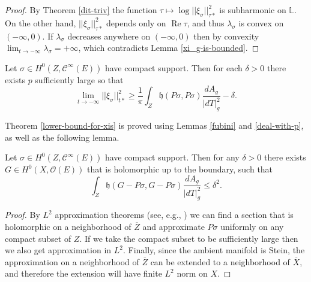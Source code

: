 \documentclass[12pt,hidelinks]{amsart}
\newcommand{\cO}{{\mathcal O}}
\newcommand{\sC}{{\mathscr C}}
\newcommand{\fh}{{\mathfrak h}}
\newcommand{\bbL}{{\mathbb L}}
\renewcommand{\Re}{\operatorname{Re}}
\begin{document}
\begin{proof}
By Theorem \ref{dit-triv} the function $\tau \mapsto \log ||\xi _{\sigma}||^2_{\tau*}$ is subharmonic on $\bbL$.  On the other hand,  $||\xi _{\sigma}||^2_{\tau*}$ depends only on $\Re \tau$, and thus $\lambda _{\sigma}$ is convex on $(-\infty, 0)$.  If $\lambda_{\sigma}$ decreases anywhere on $(-\infty, 0)$ then by convexity $\lim _{t \to -\infty} \lambda_{\sigma} = +\infty$, which contradicts Lemma \ref{xi_g-is-bounded}.
\end{proof}


\begin{thm}\label{lower-bound-for-xis}
Let $\sigma \in H^0(Z, \sC^{\infty}(E))$ have compact support. Then for each $\delta > 0$ there exists $p$ sufficiently large so that 
\[
\lim _{t \to - \infty}  ||\xi_{\sigma}||^2_{t*} \ge \frac{1}{\pi} \int _Z \fh (P\sigma, P\sigma) \frac{dA_g}{|dT|^2_g} -\delta.
\]
\end{thm}

Theorem \ref{lower-bound-for-xis} is proved using Lemmas \ref{fubini} and \ref{deal-with-p}, as well as the following lemma.  

\begin{lem}\label{bergman-runge}
Let $\sigma \in H^0(Z, \sC^{\infty}(E))$ have compact support.  Then for any $\delta > 0$ there exists $G \in H^0(X,\cO (E))$ that is holomorphic up to the boundary, such that 
\[
\int _Z  \fh( G - P\sigma, G-P\sigma)\frac{dA_{g}}{|dT|^2_{g}} \le \delta ^2 .
\]
\end{lem}

\begin{proof}
By $L^2$ approximation theorems (see, e.g., \cite[Theorem 5.6.2]{hormander-book}) we can find a section that is holomorphic on a neighborhood of $\overline{Z}$ and approximate $P\sigma$ uniformly on any compact subset of $Z$.  
If we take the compact subset to be sufficiently large then we also get approximation in $L^2$.  Finally, since the ambient manifold is Stein, the approximation on a neighborhood of $\overline{Z}$ can be extended to a neighborhood of $\overline{X}$, and therefore the extension will have finite $L^2$ norm on $X$.
\end{proof}
\end{document}
